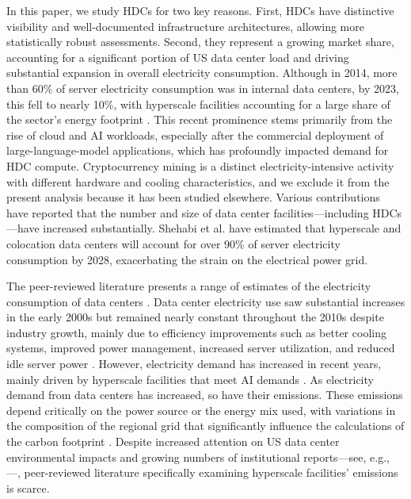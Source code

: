 \documentclass[12pt]{article}
\begin{document}
In this paper, we study HDCs for two key reasons. First, HDCs have distinctive visibility and well-documented infrastructure architectures, allowing more statistically robust assessments. Second, they represent a growing market share, accounting for a significant portion of US data center load and driving substantial expansion in overall electricity consumption. Although in 2014, more than 60\% of server electricity consumption was in internal data centers, by 2023, this fell to nearly 10\%, with hyperscale facilities accounting for a large share of the sector's energy footprint \cite{Shehabi2024DataCenter}. This recent prominence stems primarily from the rise of cloud and AI workloads, especially after the commercial deployment of large-language-model applications, which has profoundly impacted demand for HDC compute. Cryptocurrency mining is a distinct electricity-intensive activity with different hardware and cooling characteristics, and we exclude it from the present analysis because it has been studied elsewhere\cite{guidi2025environmental}. Various contributions \cite{stokel-walker2024generative,strubell2019energy, Shehabi2024DataCenter} have reported that the number and size of data center facilities---including HDCs---have increased substantially. Shehabi et al. \cite{Shehabi2024DataCenter} have estimated that hyperscale and colocation data centers will account for over 90\% of server electricity consumption by 2028, exacerbating the strain on the electrical power grid.

The peer-reviewed literature presents a range of estimates of the electricity consumption of data centers \cite{mytton2022estimates}. Data center electricity use saw substantial increases in the early 2000s but remained nearly constant throughout the 2010s despite industry growth, mainly due to efficiency improvements such as better cooling systems, improved power management, increased server utilization, and reduced idle server power \cite{Shehabi2016DataCenter}. However, electricity demand has increased in recent years, mainly driven by hyperscale facilities that meet AI demands \cite{Shehabi2024DataCenter}. As electricity demand from data centers has increased, so have their emissions. These emissions depend critically on the power source or the energy mix used, with variations in the composition of the regional grid that significantly influence the calculations of the carbon footprint \cite{ferreira2018estimating}. Despite increased attention on US data center environmental impacts and growing numbers of institutional reports---see, e.g., \cite{eia_energyconsumption,Shehabi2024DataCenter,Shehabi2016DataCenter,EESI2025}---, peer-reviewed literature specifically examining hyperscale facilities' emissions is scarce.
\end{document}
